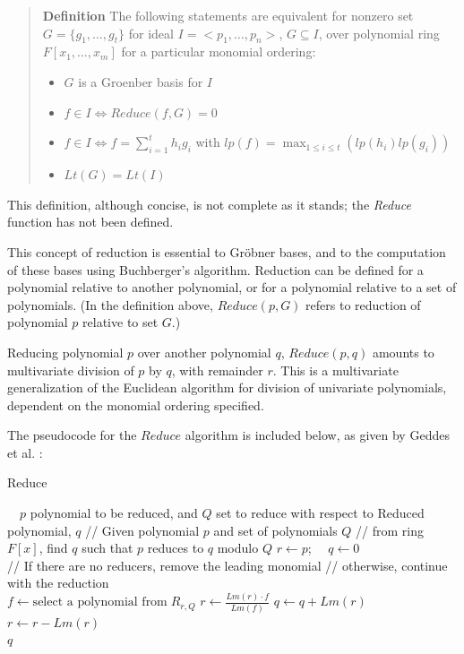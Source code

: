 \documentclass[letterpaper,12pt,titlepage,oneside,final]{book}
\newenvironment{defn}{\begin{quote}%
  \textbf{Definition }%
  \quad
}{%
\end{quote}%
}
\begin{document}
\begin{defn}\label{Groebner Basis}
  The following statements are equivalent for nonzero set ${G = \{g_1, \ldots, g_t\}}$ for ideal $I = <p_1, \ldots, p_n>$, ${G \subseteq I}$, over polynomial ring $F[x_1, \ldots, x_m]$ for a particular monomial ordering:
  \begin{itemize}
    \item ${G}$ is a Groenber basis for ${I}$
    \item ${f \in I \iff Reduce( f, G) = 0}$
    \item ${f \in I \iff f = \sum_{i=1}^{t}h_ig_i}$ with ${lp(f) = \max_{1 \leq i \leq t}(lp(h_i)lp(g_i))}$
    \item ${Lt(G) = Lt(I)}$
  \end{itemize}
\end{defn}

This definition, although concise, is not complete as it stands; the \textit{Reduce} function has not been defined.

This concept of reduction is essential to Gr\"obner bases, and to the computation of these bases using Buchberger's algorithm.  Reduction can be defined for a polynomial relative to another polynomial, or for a polynomial relative to a set of polynomials.  (In the definition above, ${Reduce( p, G)}$ refers to reduction of polynomial ${p}$ relative to set ${G}$.)  

Reducing polynomial ${p}$ over another polynomial ${q}$, ${Reduce( p, q)}$ amounts to multivariate division of ${p}$ by ${q}$, with remainder ${r}$.  This is a multivariate generalization of the Euclidean algorithm for division of univariate polynomials, dependent on the monomial ordering specified.  

\noindent The pseudocode for the ${Reduce}$ algorithm is included below, as given by Geddes et al. \cite{Geddes}:
\begin{algorithm}[H]
\caption{Reduce}\label{reduce}
\begin{algorithmic}[1]
\Input $\quad p$ polynomial to be reduced, and ${Q}$ set to reduce with respect to
\Output Reduced polynomial, ${q}$
\State // Given polynomial ${p}$ and set of polynomials ${Q}$
\State // from ring ${F[x]}$, find ${q}$ such that ${p}$ reduces to ${q}$ modulo ${Q}$
\State $r \gets p$; $\quad q \gets 0$ \\
\State // If there are no reducers, remove the leading monomial
\State // otherwise, continue with the reduction\\
    \State $f \gets \textrm{select a polynomial from}\; R_{r,Q}$
    \State $r \gets \frac{Lm(r) \cdot f}{Lm(f)}$
  \EndWhile
  \State $q \gets q + Lm(r)$
  \State $r \gets r - Lm(r)$
\EndWhile\\
\Return $q$
\EndProcedure
\end{algorithmic}
\end{algorithm}  
\end{document}
